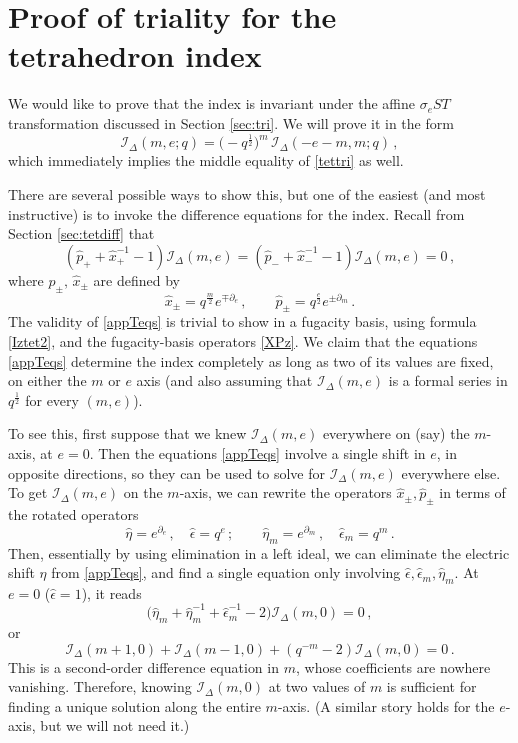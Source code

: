 \documentclass[11pt,letterpaper]{article}
\numberwithin{equation}{section}
\newcommand{\be}{\begin{equation}}
\newcommand{\ee}{\end{equation}}
\newcommand{\pd}{\partial}
\newcommand{\CI}{\mathcal{I}}
\begin{document}
\noindent\hrulefill






\appendix


\section{Proof of triality for the tetrahedron index}
\label{app:ST}

We would like to prove that the index is invariant under the affine $\sigma_eST$ transformation discussed in Section \ref{sec:tri}. We will prove it in the form
%
\be \label{appST}
\CI_\Delta(m,e;q) = \big(-q^{\frac12}\big)^m\,\CI_\Delta(-e-m,m;q)\,,
\ee
%
which immediately implies the middle equality of \eqref{tettri} as well.

There are several possible ways to show this, but one of the easiest (and most instructive) is to invoke the difference equations for the index. Recall from Section \ref{sec:tetdiff} that
%
\be (\hat p_+ + \hat x_+^{-1}-1)\CI_\Delta(m,e) = (\hat p_- + \hat x_-^{-1}-1)\CI_\Delta(m,e) = 0\,, \label{appTeqs}\ee
%
where $\hat p_\pm,\,\hat x_\pm$ are defined by
%
\be \hat x_\pm = q^{\frac m2}e^{\mp \pd_e}\,,\qquad \hat p_\pm = q^{\frac e2}e^{\pm \pd_m}\,. \label{appXP1}
\ee
%
The validity of \eqref{appTeqs} is trivial to show in a fugacity basis, using formula \eqref{Iztet2}, and the fugacity-basis operators \eqref{XPz}. We claim that the equations \eqref{appTeqs} determine the index completely as long as two of its values are fixed, on either the $m$ or $e$ axis (and also assuming that $\CI_\Delta(m,e)$ is a formal series in $q^{\frac 12}$ for every $(m,e)$).

To see this, first suppose that we knew $\CI_\Delta(m,e)$ everywhere on (say) the $m$-axis, at $e=0$. Then the equations \eqref{appTeqs} involve a single shift in $e$, in opposite directions, so they can be used to solve for $\CI_\Delta(m,e)$ everywhere else. To get $\CI_\Delta(m,e)$ on the $m$-axis, we can rewrite the operators $\hat x_\pm,\hat p_\pm$ in terms of the rotated operators
%
\be \hat\eta  = e^{\pd_e}\,,\quad \hat\epsilon=q^e\,;\qquad \hat \eta_m=e^{\pd_m}\,,\quad \hat \epsilon_m = q^m\,.\ee
%
Then, essentially by using elimination in a left ideal, we can eliminate the electric shift $\eta$ from \eqref{appTeqs}, and find a single equation only involving $\hat\epsilon,\hat\epsilon_m,\hat\eta_m$. At $e=0$ ($\hat \epsilon=1$), it reads
%
\be \big(\hat \eta_m+\hat \eta_m^{-1}+\hat\epsilon_m^{-1}-2\big)\CI_\Delta(m,0) =0\,,\ee
%
or
%
\be \CI_\Delta(m+1,0)+\CI_\Delta(m-1,0)+(q^{-m}-2)\CI_\Delta(m,0) = 0\,.\ee
%
This is a second-order difference equation in $m$, whose coefficients are nowhere vanishing. Therefore, knowing $\CI_\Delta(m,0)$ at two values of $m$ is sufficient for finding a unique solution along the entire $m$-axis. (A similar story holds for the $e$-axis, but we will not need it.)
\end{document}

